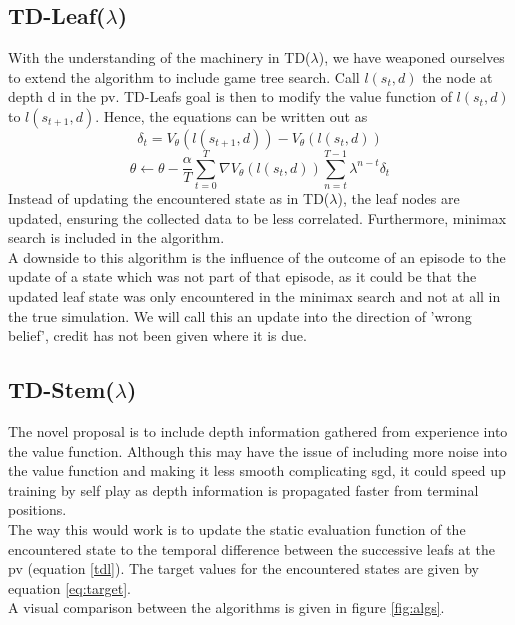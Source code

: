 \documentclass[twocolumn]{phdsymp} %
\begin{document}
\subsection{TD-Leaf($\lambda$)}
With the understanding of the machinery in TD($\lambda$), we have weaponed ourselves to extend the algorithm to include game tree search. Call $l(s_t,d)$ the node at depth d in the \gls{pv}. TD-Leafs goal is then to modify the value function of $l(s_t,d)$ to $l(s_{t+1},d)$. Hence, the equations can be written out as
\begin{equation}
\delta_t=V_\theta(l(s_{t+1},d))-V_\theta(l(s_t,d)) 
\label{tdl}
\end{equation}
\begin{equation}
\theta\leftarrow\theta-\frac{\alpha}{T}\sum_{t=0}^{T}\nabla V_\theta(l(s_t,d))\sum_{n=t}^{T-1}\lambda^{n-t}\delta_t
\end{equation}
Instead of updating the encountered state as in TD($\lambda$), the leaf nodes are updated, ensuring the collected data to be less correlated. Furthermore, minimax search is included in the algorithm.\\
A downside to this algorithm is the influence of the outcome of an episode to the update of a state which was not part of that episode, as it could be that the updated leaf state was only encountered in the minimax search and not at all in the true simulation. We will call this an update into the direction of 'wrong belief', credit has not been given where it is due.

\subsection{TD-Stem($\lambda$)}
The novel proposal is to include depth information gathered from experience into the value function. Although this may have the issue of including more noise into the value function and making it less smooth complicating \gls{sgd}, it could speed up training by self play as depth information is propagated faster from terminal positions. \\
The way this would work is to update the static evaluation function of the encountered state to the temporal difference between the successive leafs at the \Gls{pv} (equation \ref{tdl}). The target values for the encountered states are given by equation \ref{eq:target}.\\
A visual comparison between the algorithms is given in figure \ref{fig:algs}.
\end{document}
